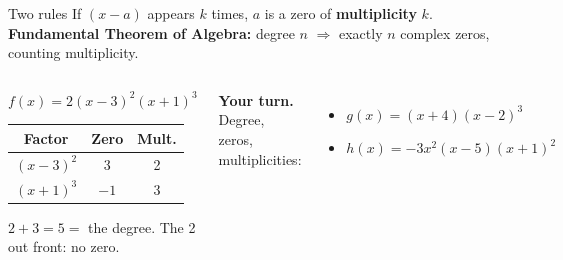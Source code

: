 \documentclass[aspectratio=169, 11pt]{beamer}
\begin{document}
\begin{frame}[t, plain]

  \begin{block}{Two rules}
    If \((x - a)\) appears \(k\) times, \(a\) is a zero of \textbf{multiplicity} \(k\).\\[3pt]
    \textbf{Fundamental Theorem of Algebra:} degree \(n\) \(\Rightarrow\) exactly \(n\) complex
    zeros, counting multiplicity.
  \end{block}

  \medskip
  \begin{columns}[T]
      \begin{center}
      {\large \(f(x) = 2(x - 3)^2(x + 1)^3\)}

      \medskip
      \renewcommand{\arraystretch}{1.3}
      \begin{tabular}{|c|c|c|}
        \hline
        \textbf{Factor} & \textbf{Zero} & \textbf{Mult.} \\ \hline
        \((x - 3)^2\) & 3 & 2 \\ \hline
        \((x + 1)^3\) & \(-1\) & 3 \\ \hline
      \end{tabular}

      \medskip
      \(2 + 3 = 5 =\) the degree. The 2 out front: no zero.
      \end{center}

      \textbf{Your turn.} Degree, zeros, multiplicities:
      \begin{itemize}\setlength{\itemsep}{6pt}
        \item \(g(x) = (x + 4)(x - 2)^3\)
        \item \(h(x) = -3x^2(x - 5)(x + 1)^2\)
      \end{itemize}
  \end{columns}
\end{frame}
\end{document}

